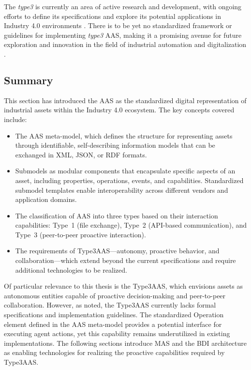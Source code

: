The \textit{type3} is currently an area of active research and development,
with ongoing efforts to define its specifications and explore its potential applications in Industry 4.0 environments \cite{Sakurada2025_MAS_AAS_Type3}.
There is to be yet no standardized framework or guidelines for implementing \textit{type3} \ac{AAS},
making it a promising avenue for future exploration and innovation in the field of industrial automation and digitalization \cite{Sakurada2025_MAS_AAS_Type3}.

\subsection{Summary}
\label{subsec:aas_summary}

This section has introduced the \ac{AAS} as the standardized digital representation of industrial assets within the Industry 4.0 ecosystem. The key concepts covered include:

\begin{itemize}
    \item The \ac{AAS} meta-model, which defines the structure for representing assets through identifiable, self-describing information models that can be exchanged in \ac{XML}, \ac{JSON}, or \ac{RDF} formats.
    
    \item Submodels as modular components that encapsulate specific aspects of an asset, including properties, operations, events, and capabilities. Standardized submodel templates enable interoperability across different vendors and application domains.
    
    \item The classification of \ac{AAS} into three types based on their interaction capabilities: Type~1 (file exchange), Type~2 (API-based communication), and Type~3 (peer-to-peer proactive interaction).
    
    \item The requirements of \ac{Type3AAS}---autonomy, proactive behavior, and collaboration---which extend beyond the current specifications and require additional technologies to be realized.
\end{itemize}

Of particular relevance to this thesis is the \ac{Type3AAS}, which envisions assets as autonomous entities capable of proactive decision-making and peer-to-peer collaboration. However, as noted, the \ac{Type3AAS} currently lacks formal specifications and implementation guidelines. The standardized Operation element defined in the \ac{AAS} meta-model provides a potential interface for executing agent actions, yet this capability remains underutilized in existing implementations. The following sections introduce \ac{MAS} and the \ac{BDI} architecture as enabling technologies for realizing the proactive capabilities required by \ac{Type3AAS}.



